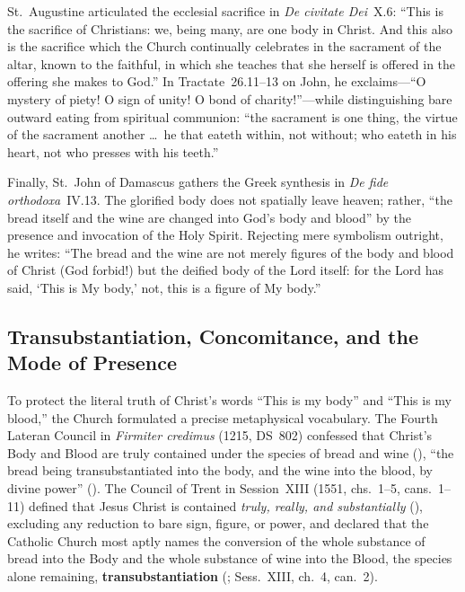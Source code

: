 St.~Augustine articulated the ecclesial sacrifice in \emph{De civitate Dei}~X.6: ``This is the sacrifice of Christians: we, being many, are one body in Christ. And this also is the sacrifice which the Church continually celebrates in the sacrament of the altar, known to the faithful, in which she teaches that she herself is offered in the offering she makes to God.'' In Tractate~26.11--13 on John, he exclaims---``O mystery of piety! O sign of unity! O bond of charity!''---while distinguishing bare outward eating from spiritual communion: ``the sacrament is one thing, the virtue of the sacrament another \dots\ he that eateth within, not without; who eateth in his heart, not who presses with his teeth.''

Finally, St.~John of Damascus gathers the Greek synthesis in \emph{De fide orthodoxa}~IV.13. The glorified body does not spatially leave heaven; rather, ``the bread itself and the wine are changed into God's body and blood'' by the presence and invocation of the Holy Spirit. Rejecting mere symbolism outright, he writes: ``The bread and the wine are not merely figures of the body and blood of Christ (God forbid!) but the deified body of the Lord itself: for the Lord has said, `This is My body,' not, this is a figure of My body.''

\subsection{Transubstantiation, Concomitance, and the Mode of Presence}
\label{subsec:eucharist-transubstantiation}

To protect the literal truth of Christ's words ``This is my body'' and ``This is my blood,'' the Church formulated a precise metaphysical vocabulary. The Fourth Lateran Council in \emph{Firmiter credimus} (1215, DS~802) confessed that Christ's Body and Blood are truly contained under the species of bread and wine (), ``the bread being transubstantiated into the body, and the wine into the blood, by divine power'' (). The Council of Trent in Session~XIII (1551, chs.~1--5, cans.~1--11) defined that Jesus Christ is contained \emph{truly, really, and substantially} (), excluding any reduction to bare sign, figure, or power, and declared that the Catholic Church most aptly names the conversion of the whole substance of bread into the Body and the whole substance of wine into the Blood, the species alone remaining, \textbf{transubstantiation} (; Sess.~XIII, ch.~4, can.~2).

